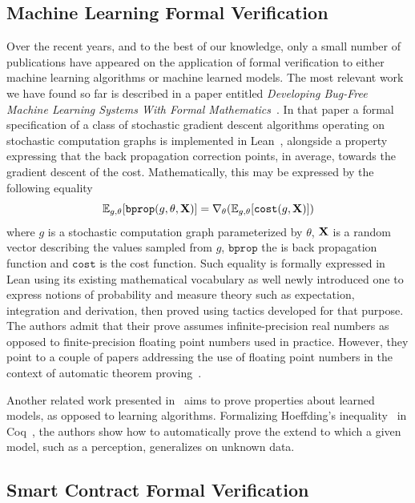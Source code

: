 \documentclass[]{report}
\begin{document}
\subsection{Machine Learning Formal Verification}

Over the recent years, and to the best of our knowledge, only a small
number of publications have appeared on the application of formal
verification to either machine learning algorithms or machine learned
models.  The most relevant work we have found so far is described in a
paper entitled \emph{Developing Bug-Free Machine Learning Systems With
  Formal Mathematics}~\cite{DBLP:journals/corr/SelsamLD17}.  In that
paper a formal specification of a class of stochastic gradient descent
algorithms operating on stochastic computation graphs is implemented
in Lean~\cite{Lean}, alongside a property expressing that the back
propagation correction points, in average, towards the gradient
descent of the cost.  Mathematically, this may be expressed by the
following equality
$$\mathbb{E}_{g,\theta}[\texttt{bprop}(g,\theta,\bold{X})] = \nabla_{\theta}(\mathbb{E}_{g,\theta}[\texttt{cost}(g,\bold{X})])$$
where $g$ is a stochastic computation graph parameterized by $\theta$,
$\bold{X}$ is a random vector describing the values sampled from $g$,
$\texttt{bprop}$ the is back propagation function and $\texttt{cost}$
is the cost function.  Such equality is formally expressed in Lean
using its existing mathematical vocabulary as well newly introduced
one to express notions of probability and measure theory such as
expectation, integration and derivation, then proved using tactics
developed for that purpose.  The authors admit that their prove
assumes infinite-precision real numbers as opposed to finite-precision
floating point numbers used in practice.  However, they point to a
couple of papers addressing the use of floating point numbers in the
context of automatic theorem proving~\cite{Harrison2006,
  Ramananandro2016}.

Another related work presented in~\cite{Bagnall2019} aims to prove
properties about learned models, as opposed to learning algorithms.
Formalizing Hoeffding's inequality~\cite{Hoeffding1963} in
Coq~\cite{Bertot2004}, the authors show how to automatically prove the
extend to which a given model, such as a perception, generalizes on
unknown data.

\subsection{Smart Contract Formal Verification}
\end{document}
